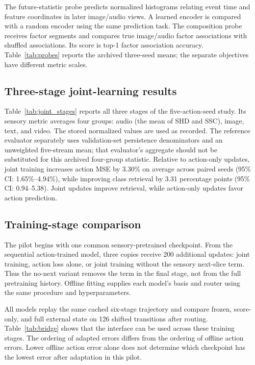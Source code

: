 The future-statistic probe predicts normalized histograms relating event
time and feature coordinates in later image/audio views. A learned encoder
is compared with a random encoder using the same prediction task. The
composition probe receives factor segments and compares true image/audio
factor associations with shuffled associations. Its score is top-1 factor
association accuracy. Table~\ref{tab:probes} reports the archived three-seed
means; the separate objectives have different metric scales.


\subsection{Three-stage joint-learning results}
\label{app:joint}
Table~\ref{tab:joint_stages} reports all three stages of the five-action-seed
study. Its sensory metric averages four groups: audio (the mean of SHD and
SSC), image, text, and video. The stored normalized values are used as
recorded. The reference evaluator separately uses validation-set persistence
denominators and an unweighted five-stream mean; that evaluator's aggregate
should not be substituted for this archived four-group statistic.
Relative to action-only updates, joint training increases action MSE by
3.30\% on average across paired seeds (95\% CI: 1.65\%--4.94\%), while
improving class retrieval by 3.31 percentage points (95\% CI: 0.94--5.38).
Joint updates improve retrieval, while action-only updates favor action
prediction.


\subsection{Training-stage comparison}
\label{app:bridge}
The pilot begins with one common sensory-pretrained checkpoint. From the
sequential action-trained model, three copies receive 200 additional updates:
joint training, action loss alone, or joint training without the sensory
next-slice term. Thus the no-next variant removes the term in the final stage,
not from the full pretraining history. Offline fitting supplies each model's
basis and router using the same procedure and hyperparameters.

All models replay the same cached six-stage trajectory and compare frozen,
score-only, and full external state on 126 shifted transitions after routing.
Table~\ref{tab:bridge} shows that the interface can be used across these
training stages. The ordering of adapted errors differs from the ordering of offline action
errors. Lower offline action error alone does not determine which checkpoint
has the lowest error after adaptation in this pilot.


